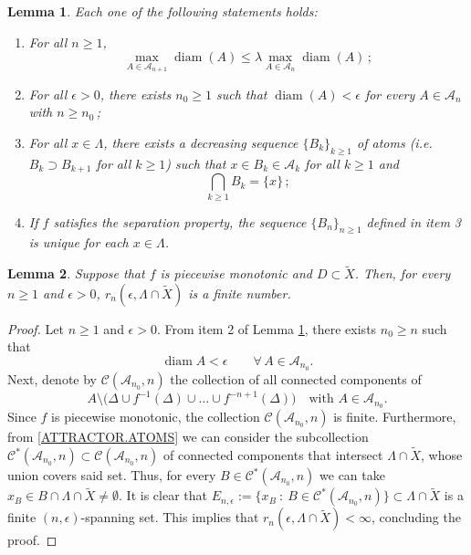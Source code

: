 \documentclass[10pt,a4paper]{amsart}
\newtheorem{lemma}{Lemma}
\DeclareMathOperator{\diam}{diam}
\begin{document}
\begin{lemma}\label{ATOMS.LEMMA}
    Each one of the following statements holds:
    \begin{enumerate}
        \item For all $n\geq1$,
        \[
            \max_{A\in\mathcal A_{n+1}}\diam(A)\leq \lambda \max_{A\in\mathcal A_{n}}\diam(A)\,;
        \]
        \item For all $\epsilon>0$, there exists $n_0\geq1$ such that $\diam(A)<\epsilon$ for every $A\in\mathcal A_{n}$ with $n\geq n_0\,$;
        \item For all $x\in\Lambda$, there exists a decreasing sequence $\{B_k\}_{k\geq1}$ of atoms (i.e. $B_k\supset B_{k+1}$ for all $k\geq 1$) such that $x\in B_k\in\mathcal A_k$ for all $k\geq1$ and
        \begin{equation}
            \bigcap_{k\geq1}B_k=\{x\}\,;\label{ONEPOINT}
        \end{equation}
        \item If $f$ satisfies the separation property, the sequence  $\{B_n\}_{n\geq1}$ defined in item 3 is unique for each $x\in\Lambda$.
    \end{enumerate}
\end{lemma}

\begin{lemma}\label{WELL}
    Suppose that $f$ is piecewise monotonic and $D\subset\widetilde X$. Then, for every $n\geq1$ and $\epsilon>0$, $r_n(\epsilon,\Lambda\cap\widetilde X)$ is a finite number.
\end{lemma}

\begin{proof}
Let $n\geq1$ and $\epsilon>0$. From item 2 of Lemma \ref{ATOMS.LEMMA}, there exists $n_0\geq n$ such that
    \begin{equation}
        \diam A<\epsilon\qquad \forall\,A\in\mathcal A_{n_0}. \label{ATOM.EPSILON}
    \end{equation}
    Next, denote by $\mathcal C(\mathcal A_{n_0},n)$ the collection of all connected components of
    \[
        A\setminus\big(\Delta\cup f^{-1}(\Delta)\cup\ldots\cup f^{-n+1}(\Delta)\big)\quad\text{with $A \in \mathcal A_{n_0}$.}
    \]
{Since $f$ is piecewise monotonic, the collection $\mathcal C(\mathcal A_{n_0},n)$ is finite. Furthermore, from \eqref{ATTRACTOR.ATOMS} we can consider the subcollection $\mathcal C^*(\mathcal A_{n_0},n)\subset\mathcal C(\mathcal A_{n_0},n)$ of connected components that intersect $\Lambda\cap\widetilde X$, whose union covers said set. Thus, for every $B\in \mathcal C^*(\mathcal A_{n_0},n)$ we can take $x_B\in B\cap\Lambda\cap\widetilde X\neq\emptyset$. It is clear that $E_{n,\epsilon}:=\{x_B\ :\ B\in\mathcal C^*(\mathcal A_{n_0},n)\}\subset\Lambda\cap\widetilde X$ is a finite $(n,\epsilon)$-spanning set. This implies that $r_n(\epsilon,\Lambda\cap\widetilde X)<\infty$, concluding the proof.}
\end{proof}
\end{document}
